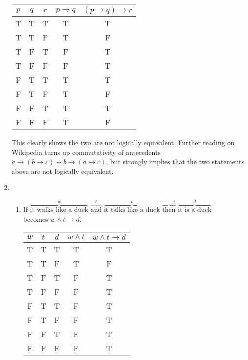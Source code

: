 \documentclass[12pt]{article}
\begin{document}
\begin{enumerate}
\begin{tabular} {|c|c|c||c|c|}
\hline
$p$ & $q$ & $r$ & $p \rightarrow q$ & $(p \rightarrow q) \rightarrow r$\\ \hline
T & T & T & T & T\\
T & T & F & T & F\\
T & F & T & F & T\\
T & F & F & F & T\\
F & T & T & T & T\\
F & T & F & T & F\\
F & F & T & T & T\\
F & F & F & T & F\\ \hline
\end{tabular}

This clearly shows the two are not logically equivalent. Further reading on Wikipedia turns up commutativity
of antecedents $a \rightarrow (b \rightarrow c) \equiv b \rightarrow (a \rightarrow c)$, but strongly implies
that the two statements above are not logically equivalent.
\pagebreak{}
\setcounter{enumi}{17} %
\item
  \begin{enumerate}
  \item If $\overbrace{\text{it walks like a duck}}^{w}$ $\overbrace{\text{and}}^{\wedge}$ $\overbrace{\text{it talks like a duck}}^{t}$ $\overbrace{\text{then}}^{\rightarrow}$ $\overbrace{\text{it is a duck}}^{d}$ \\becomes $w \wedge t \rightarrow d$.\\[\baselineskip]
\begin{tabular} {|c|c|c||c|c|}
\hline
$w$ & $t$ & $d$ & $w \wedge t$ & $w \wedge t \rightarrow d$\\ \hline
T & T & T & T & T\\
T & T & F & T & F\\
T & F & T & F & T\\
T & F & F & F & T\\
F & T & T & F & T\\
F & T & F & F & T\\
F & F & T & F & T\\
F & F & F & F & T\\ \hline
\end{tabular}


\end{enumerate}
\end{enumerate}
\end{document}
